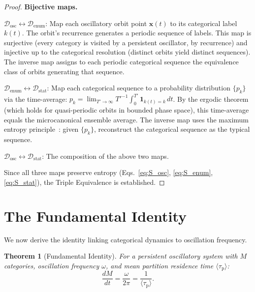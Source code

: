 \documentclass[11pt,twocolumn,a4paper]{article}
\newtheorem{theorem}{Theorem}[section]
\newcommand{\taup}{\tau_{\mathrm{p}}}
\begin{document}
\begin{proof}
\medskip
\noindent\textbf{Bijective maps.}

\noindent$\mathcal{D}_{\text{osc}} \leftrightarrow \mathcal{D}_{\text{enum}}$:
Map each oscillatory orbit point $\bm{x}(t)$ to its categorical label $k(t)$. The orbit's recurrence generates a periodic sequence of labels. This map is surjective (every category is visited by a persistent oscillator, by recurrence) and injective up to the categorical resolution (distinct orbits yield distinct sequences). The inverse map assigns to each periodic categorical sequence the equivalence class of orbits generating that sequence.

\noindent$\mathcal{D}_{\text{enum}} \leftrightarrow \mathcal{D}_{\text{stat}}$:
Map each categorical sequence to a probability distribution $\{p_k\}$ via the time-average: $p_k = \lim_{T' \to \infty} T'^{-1} \int_0^{T'} \mathbf{1}_{k(t)=k} \, dt$. By the ergodic theorem (which holds for quasi-periodic orbits in bounded phase space), this time-average equals the microcanonical ensemble average. The inverse map uses the maximum entropy principle~\citep{jaynes2003}: given $\{p_k\}$, reconstruct the categorical sequence as the typical sequence.

\noindent$\mathcal{D}_{\text{osc}} \leftrightarrow \mathcal{D}_{\text{stat}}$:
The composition of the above two maps.

Since all three maps preserve entropy (Eqs.~\eqref{eq:S_osc}, \eqref{eq:S_enum}, \eqref{eq:S_stat}), the Triple Equivalence is established.
\end{proof}

\section{The Fundamental Identity}\label{sec:fundamental_identity}

We now derive the identity linking categorical dynamics to oscillation frequency.

\begin{theorem}[Fundamental Identity]\label{thm:fundamental_identity}
For a persistent oscillatory system with $M$ categories, oscillation frequency $\omega$, and mean partition residence time $\langle \taup \rangle$:
\begin{equation}
    \frac{dM}{dt} = \frac{\omega}{2\pi} = \frac{1}{\langle \taup \rangle}.
    \label{eq:fundamental_identity}
\end{equation}
\end{theorem}
\end{document}
